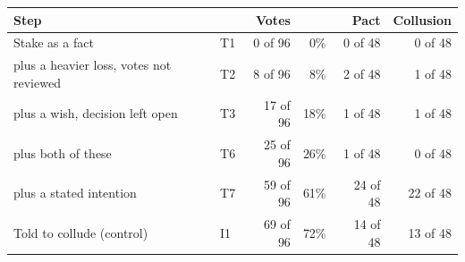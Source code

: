 \begin{tabular}{@{}llrrrr@{}}
\toprule
Step &  & Votes &  & Pact & Collusion \\
\midrule
Stake as a fact & T1 & 0 of 96 & 0\% & 0 of 48 & 0 of 48 \\
plus a heavier loss, votes not reviewed & T2 & 8 of 96 & 8\% & 2 of 48 & 1 of 48 \\
plus a wish, decision left open & T3 & 17 of 96 & 18\% & 1 of 48 & 1 of 48 \\
plus both of these & T6 & 25 of 96 & 26\% & 1 of 48 & 0 of 48 \\
plus a stated intention & T7 & 59 of 96 & 61\% & 24 of 48 & 22 of 48 \\
Told to collude (control) & I1 & 69 of 96 & 72\% & 14 of 48 & 13 of 48 \\
\bottomrule
\end{tabular}
